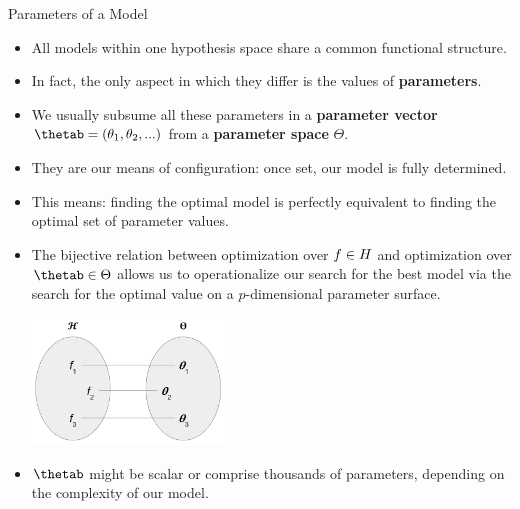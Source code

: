 \documentclass[11pt,compress,t,notes=noshow, xcolor=table]{beamer}
\begin{document}
\begin{vbframe}{Parameters of a Model}

\begin{itemize}
  
  \item All models within one hypothesis space share a common functional 
  structure.
  
  \item In fact, the only aspect in which they differ is the values of 
  \textbf{parameters}.
  
  \item We usually subsume all these parameters in a \textbf{parameter vector} 
  $\thetab = (\theta_1, \theta_2, ...)$ from a \textbf{parameter space} 
  $\Theta$.
  
  \item They are our means of configuration: once set, our model is 
  fully determined.
  
  
  \framebreak
  
  \item This means: finding the optimal model is perfectly equivalent to 
  finding the optimal set of parameter values.
  
  \item The bijective relation between optimization over $f \in H$ and 
  optimization over $\thetab \in \Theta$ allows us to operationalize our search
  for the best model via the search for the optimal value on a $p$-dimensional
  parameter surface.
  
  \begin{center}
    \includegraphics[width = 0.4\textwidth]{figure_man/bijection_f_theta.PNG} 
  \end{center}
  
  \item $\thetab$ might be scalar or comprise thousands of parameters,
  depending on the complexity of our model.
  
\end{itemize}

\end{vbframe}
\end{document}
